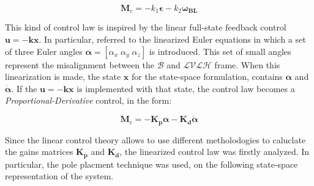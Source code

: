 \begin{equation}
    \boldsymbol{M}_c=-k_1\boldsymbol{\epsilon}-k_2\boldsymbol{{\omega}_{BL}}
\end{equation}

This kind of control law is inspired by the linear full-state feedback control  $\boldsymbol{u} = -\boldsymbol{kx} $. In particular, referred to the linearized Euler equations in which a set of three Euler angles $\boldsymbol{\alpha} = \left[\alpha_x \; \alpha_y \; \alpha_z \right]$ is introduced. This set of small angles represent the misalignment between the $\mathcal{B}$ and $\mathcal{LVLH}$ frame. When this linearization is made, the state $\boldsymbol{x}$ for the state-space formulation, contains $\boldsymbol{\alpha}$ and $\dot{\boldsymbol{\alpha}}$. If the $\boldsymbol{u} = -\boldsymbol{kx} $ is implemented with that state, the control law becomes a \textit{Proportional-Derivative} control, in the form:

\begin{equation}
    \boldsymbol{M}_c=-\boldsymbol{K_p}\boldsymbol{\alpha}-\boldsymbol{K_d}\dot{\boldsymbol{\alpha}}
\end{equation}

Since the linear control theory allows to use different metholodogies to caluclate the gains matrices $\boldsymbol{K_p}$ and $\boldsymbol{K_d}$, the linearized control law was firstly analyzed. In particular, the pole placment technique was used, on the following state-space representation of the system. 

